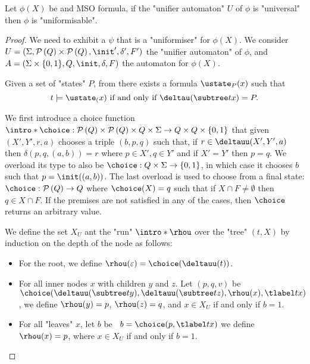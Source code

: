 \documentclass{article}
\begin{document}
\begin{lemma}
	Let $\phi(X)$ be and MSO formula, if the "unifier automaton" $U$ of $\phi$ is "universal" then $\phi$ is "uniformisable".
\end{lemma}

\begin{proof}
	We need to exhibit a $\psi$ that is a "uniformiser" for $\phi(X)$.
	We consider $U = (\Sigma, \parts Q \times \parts Q,\init', \delta', F')$ the "unifier automaton" of $\phi$, and
	$A =  (\Sigma \times \{0,1\}, Q, \init, \delta, F)$ the automaton for $\phi(X)$.

	Given a set of "states" $P$, from  there exists a formula $\ustate_P(x)$ such that
	\[ t \models \ustate_(x) \text{ if and only if } \deltau(\subtree t x) = P .\]


	We first introduce a choice function $\intro*\choice : \parts Q \times \parts Q \times Q \times \Sigma \to Q \times Q \times \set{0,1}$
	that given $(X',Y',r,a)$ chooses a triple $(b,p,q)$ such that, if $r \in \deltauu(X',Y', a)$ then $\delta(p,q,(a,b)) = r$ where $p \in X', q \in Y'$
	and if $X' = Y'$ then $p = q$. We overload its type to also be $\choice : Q \times \Sigma \to \set{0,1} $, in which case it chooses
	$b$ such that $p = \init((a,b))$. The last overload is used to choose from a final state: $\choice : \parts Q \to  Q$ where
	$\choice (X) = q$ such that if $X \cap F \neq \emptyset$ then $q \in X \cap F$. If the premises are not satisfied in any of the cases, then
	$\choice$ returns an arbitrary value.

	We define the set $X_U$ ant the "run" $\intro*\rhou$ over the "tree" $(t,X)$ by induction on the depth of the node as follows:
	\begin{itemize}
		\item For the root, we define $\rhou(\varepsilon) = \choice(\deltauu(t))$.
		\item For all inner nodes $x$ with children $y$ and $z$. Let $(p,q,v)$ be~$\choice(\deltauu(\subtree t y), \deltauu(\subtree t z), \rhou(x), \tlabel t x)$, we define
		      $\rhou(y)=p$, $\rhou(z)=q$, and $x \in X_U$ if and only if $b = 1$.
		\item For all "leaves" $x$, let $b$ be ~$b = \choice(p, \tlabel t x)$ we define $\rhou (x) = p$, where $x \in X_U$ if and only if $b = 1$.
	\end{itemize}


\end{proof}
\end{document}

